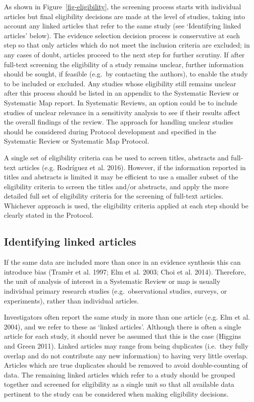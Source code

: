 \documentclass[
  letterpaper,
  DIV=11,
  numbers=noendperiod]{scrreprt}
\begin{document}
As shown in Figure~\ref{fig-eligibility}, the screening process starts
with individual articles but final eligibility decisions are made at the
level of studies, taking into account any linked articles that refer to
the same study (see `Identifying linked articles' below). The evidence
selection decision process is conservative at each step so that only
articles which do not meet the inclusion criteria are excluded; in any
cases of doubt, articles proceed to the next step for further scrutiny.
If after full-text screening the eligibility of a study remains unclear,
further information should be sought, if feasible (e.g.~by contacting
the authors), to enable the study to be included or excluded. Any
studies whose eligibility still remains unclear after this process
should be listed in an appendix to the Systematic Review or Systematic
Map report. In Systematic Reviews, an option could be to include studies
of unclear relevance in a sensitivity analysis to see if their results
affect the overall findings of the review. The approach for handling
unclear studies should be considered during Protocol development and
specified in the Systematic Review or Systematic Map Protocol.

A single set of eligibility criteria can be used to screen titles,
abstracts and full-text articles (e.g. Rodríguez et al. 2016). However,
if the information reported in titles and abstracts is limited it may be
efficient to use a smaller subset of the eligibility criteria to screen
the titles and/or abstracts, and apply the more detailed full set of
eligibility criteria for the screening of full-text articles. Whichever
approach is used, the eligibility criteria applied at each step should
be clearly stated in the Protocol.

\subsection{Identifying linked
articles}\label{identifying-linked-articles}

If the same data are included more than once in an evidence synthesis
this can introduce bias (Tramèr et al. 1997; Elm et al. 2003; Choi et
al. 2014). Therefore, the unit of analysis of interest in a Systematic
Review or map is usually individual primary research studies
(e.g.~observational studies, surveys, or experiments), rather than
individual articles.

Investigators often report the same study in more than one article (e.g.
Elm et al. 2004), and we refer to these as `linked articles'. Although
there is often a single article for each study, it should never be
assumed that this is the case (Higgins and Green 2011). Linked articles
may range from being duplicates (i.e.~they fully overlap and do not
contribute any new information) to having very little overlap. Articles
which are true duplicates should be removed to avoid double-counting of
data. The remaining linked articles which refer to a study should be
grouped together and screened for eligibility as a single unit so that
all available data pertinent to the study can be considered when making
eligibility decisions.
\end{document}
